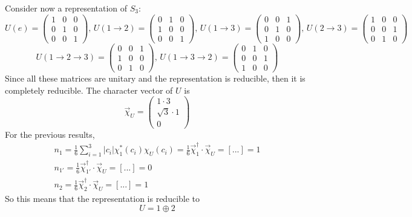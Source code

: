 Consider now a representation of $S_3$:
$$U(e) = \begin{pmatrix}
    1&0&0\\0&1&0\\0&0&1
\end{pmatrix},\,U(1\to2)=\begin{pmatrix}
    0&1&0\\
    1&0&0\\
    0&0&1
\end{pmatrix},\,U(1\to3)=\begin{pmatrix}
    0&0&1\\
    0&1&0\\
    1&0&0
\end{pmatrix},\,U(2\to3)=\begin{pmatrix}
    1&0&0\\
    0&0&1\\
    0&1&0
\end{pmatrix}
$$
$$U(1\to2\to3) = \begin{pmatrix}
    0&0&1\\
    1&0&0\\
    0&1&0
\end{pmatrix},\,U(1\to3\to2) = \begin{pmatrix}
    0&1&0\\
    0&0&1\\
    1&0&0
\end{pmatrix}
$$
Since all these matrices are unitary and the representation is reducible, then
it is completely reducible. The character vector of $U$ is
$$\vec{\chi}_U=\begin{pmatrix}
1\cdot 3\\\sqrt{3}\cdot1\\0
\end{pmatrix}
$$
For the previous results,
\begin{gather*}
n_1 = \frac{1}{6}\sum_{i=1}^{3}|c_i|\chi_1^*(c_i)\chi_U(c_i)=
\frac{1}{6}\vec{\chi}_1^\dagger\cdot\vec{\chi}_U = [...]=1\\
n_{1'}= \frac{1}{6}\vec{\chi}_{1'}^\dagger\cdot\vec{\chi}_U = [...]=0\\
n_2 = \frac{1}{6}\vec{\chi}_2^\dagger\cdot\vec{\chi}_U = [...] = 1
\end{gather*}
So this means that the representation is reducible to
$$U = 1\oplus2$$\\

